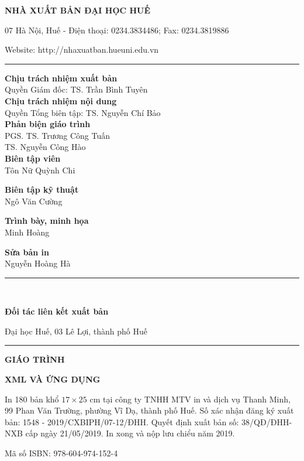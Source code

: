 \documentclass[12pt]{book}
\begin{document}
\begin{center}
	{\bf NHÀ XUẤT BẢN ĐẠI HỌC HUẾ}
	
	07 Hà Nội, Huế - Điện thoại: 0234.3834486; Fax: 0234.3819886
	
	Website: http://nhaxuatban.hueuni.edu.vn\\
	\vspace{-0.4cm}	
	\rule{11.2cm}{0.25mm}
	
	\vspace{0.2cm}
	{\bf Chịu trách nhiệm xuất bản\\}
	Quyền Giám đốc: TS. Trần Bình Tuyên\\
		\vspace{0.2cm}
	{\bf Chịu trách nhiệm nội dung\\}
	Quyền Tổng biên tập: TS. Nguyễn Chí Bảo\\
	\vspace{0.2cm}
	{\bf Phản biện giáo trình}\\
	PGS. TS. Trương Công Tuấn\\
	TS. Nguyễn Công Hào\\
	\vspace{0.2cm}
	{\bf Biên tập viên}\\
	
	Tôn Nữ Quỳnh Chi
	
		\vspace{0.2cm}
	{\bf Biên tập kỹ thuật}\\
		Ngô Văn Cường	
	\vspace{0.1cm}
	
	{\bf Trình bày, minh họa}\\
		Minh Hoàng
	
	\vspace{0.1cm}
	{\bf Sửa bản in}\\
	Nguyễn Hoàng Hà\\
	
	\vspace{-0.2cm}
	\rule{7.2cm}{0.25mm}\\
	
	\vspace{-0.2cm}
	
	{\bf Đối tác liên kết xuất bản}
	
	Đại học Huế, 03 Lê Lợi, thành phố Huế\\
	\vspace{-0.3cm}
	\rule{7.3cm}{0.25mm}
	
	\vspace{0.2cm}
	{\bf GIÁO TRÌNH}
	
	{\bf XML VÀ ỨNG DỤNG}
\end{center}
\vspace{-1.0cm}
\vfill

In 180 bản khổ $17\times25$ cm tại công ty TNHH MTV in và dịch vụ Thanh Minh, 99 Phan Văn Trường, phường Vĩ Dạ, thành phố Huế. Số xác nhận đăng ký xuất bản: 1548 - 2019/CXBIPH/07-12/ĐHH.
Quyết định xuất bản số: 38/QĐ/ĐHH-NXB cấp ngày 21/05/2019. 
In xong và nộp lưu chiểu năm 2019.

Mã số ISBN: 978-604-974-152-4
\end{document}
